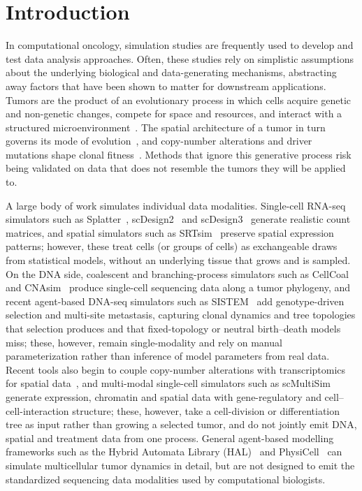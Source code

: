 \documentclass{article}
\begin{document}
\section{Introduction}
\label{sec:introduction}
In computational oncology, simulation studies are frequently used to develop and test data
analysis approaches. Often, these studies rely on simplistic assumptions about the underlying
biological and data-generating mechanisms, abstracting away factors that have been shown to
matter for downstream applications. Tumors are the product of an evolutionary process in which
cells acquire genetic and non-genetic changes, compete for space and resources, and interact
with a structured microenvironment~\cite{gerlinger_intratumor_2012, black_genetic_2021,
whiting_phenotypic_2024}. The spatial architecture of a tumor in turn governs its mode of
evolution~\cite{noble_spatial_2022, waclaw_spatial_2015}, and copy-number alterations and
driver mutations shape clonal fitness~\cite{dinh_cinner_2025}. Methods that ignore this
generative process risk being validated on data that does not resemble the tumors they will be
applied to.

A large body of work simulates individual data modalities. Single-cell RNA-seq simulators such
as Splatter~\cite{zappia_splatter_2017}, scDesign2~\cite{sun_scdesign2_2021} and
scDesign3~\cite{song_scdesign3_2024} generate realistic count matrices, and spatial simulators
such as SRTsim~\cite{zhu_srtsim_2023} preserve spatial expression patterns; however, these
treat cells (or groups of cells) as exchangeable draws from statistical models, without an
underlying tissue that grows and is sampled. On the DNA side, coalescent and branching-process
simulators such as CellCoal~\cite{posada_cellcoal_2020} and CNAsim~\cite{weiner_cnasim_2023}
produce single-cell sequencing data along a tumor phylogeny, and recent agent-based DNA-seq
simulators such as SISTEM~\cite{weiner_sistem_2025} add genotype-driven selection and multi-site
metastasis, capturing clonal dynamics and tree topologies that selection produces and that
fixed-topology or neutral birth--death models miss; these, however, remain single-modality and
rely on manual parameterization rather than inference of model parameters from real data. Recent tools also begin to couple
copy-number alterations with transcriptomics for spatial data~\cite{xu_stcnasim_2024}, and
multi-modal single-cell simulators such as scMultiSim~\cite{li_scmultisim_2025} generate
expression, chromatin and spatial data with gene-regulatory and cell--cell-interaction
structure; these, however, take a cell-division or differentiation tree as input rather than
growing a selected tumor, and do not jointly emit DNA, spatial and treatment data from one
process. General agent-based modelling frameworks such as the Hybrid Automata Library
(HAL)~\cite{bravo_hal_2020} and PhysiCell~\cite{ghaffarizadeh_physicell_2018} can simulate
multicellular tumor dynamics in detail, but are not designed to emit the standardized
sequencing data modalities used by computational biologists.
\end{document}
